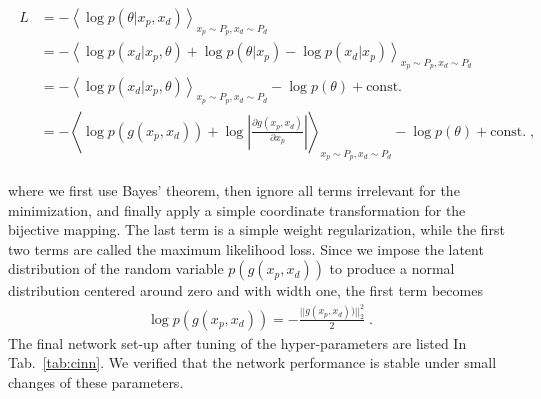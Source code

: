 \begin{align}
\begin{split}
L &= -  \left\langle \log p(\theta |x_p,x_d) \right\rangle_{x_p\sim P_p,x_d \sim P_d} \\
&= -  \left\langle \log p(x_d |x_p, \theta) + \log p(\theta|x_p) - \log p(x_d|x_p)\right\rangle_{x_p\sim P_p,x_d \sim P_d} \\
&= - \left\langle  \log p(x_d |x_p,\theta) \right\rangle_{x_p\sim P_p,x_d \sim P_d}  - \log p(\theta) + \text{const.} \\
&= - \left\langle \log p(g(x_p,x_d)) + \log \left| \frac{\partial g(x_p,x_d)}{\partial x_p} \right| \right\rangle_{x_p\sim P_p,x_d \sim P_d}  - \log p(\theta) + \text{const.} \; ,
\end{split}
\label{eq:loss}
\end{align}

where we first use Bayes' theorem, then ignore all terms irrelevant
for the minimization, and finally apply a simple coordinate transformation
for the bijective mapping. The last term is a simple weight
regularization, while the first two terms are called the maximum
likelihood loss. Since we impose the latent distribution of the random
variable $p(g(x_p, x_d))$ to produce a normal distribution centered
around zero and with width one, the first term becomes
%
\begin{align}
  \log p(g(x_p,x_d)) = -\frac{||g(x_p, x_d))||_2^2}{2} \; .
\end{align}
%
The final network set-up after tuning of the hyper-parameters are listed
 In Tab.~\ref{tab:cinn}. We verified that the network performance is 
 stable under small changes of these parameters.

